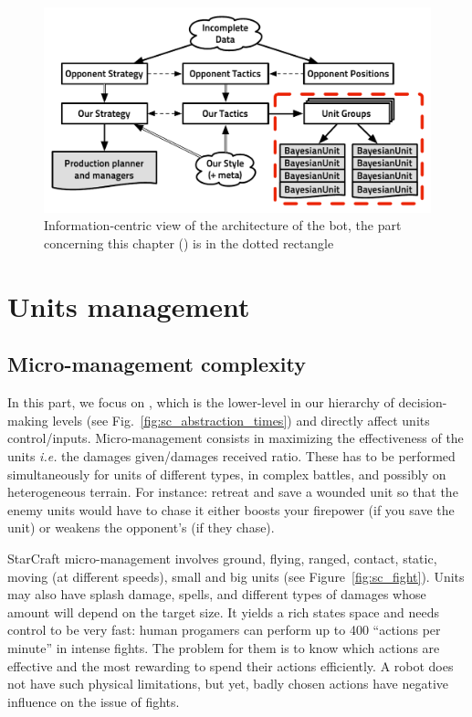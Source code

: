 
\begin{figure}[ht]
\begin{center}
\includegraphics[width=0.84\columnwidth]{images/starcraft_bbq_concept_MICRO.pdf}
\end{center}
\caption{Information-centric view of the architecture of the bot, the part concerning this chapter () is in the dotted rectangle}
\label{fig:conceptMICRO}
\end{figure}

\section{Units management}
\subsection{Micro-management complexity}
In this part, we focus on , which is the lower-level in our hierarchy of decision-making levels (see Fig.~\ref{fig:sc_abstraction_times}) and directly affect units control/inputs. Micro-management consists in maximizing the effectiveness of the units \textit{i.e.} the damages given/damages received ratio. These has to be performed simultaneously for units of different types, in complex battles, and possibly on heterogeneous terrain. 
For instance: retreat and save a wounded unit so that the enemy units would have to chase it either boosts your firepower (if you save the unit) or weakens the opponent's (if they chase). 

StarCraft micro-management involves ground, flying, ranged, contact, static, moving (at different speeds), small and big units (see Figure~\ref{fig:sc_fight}). Units may also have splash damage, spells, and different types of damages whose amount will depend on the target size. It yields a rich states space and needs control to be very fast: human progamers can perform up to 400 ``actions per minute'' in intense fights. The problem for them is to know which actions are effective and the most rewarding to spend their actions efficiently. A robot does not have such physical limitations, but yet, badly chosen actions have negative influence on the issue of fights. %

